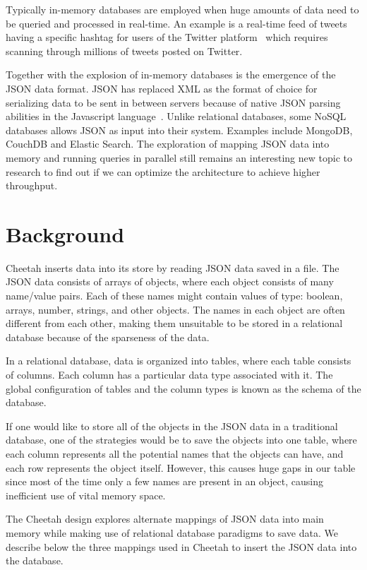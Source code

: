 \documentclass[11pt,journal,compsoc]{IEEEtran}
\begin{document}
Typically in-memory databases are employed when huge amounts of data need to be
queried and processed in real-time. An example is a real-time feed of tweets
having a specific hashtag for users of the Twitter platform~\cite{twitter}
which requires scanning through millions of tweets posted on Twitter.


Together with the explosion of in-memory databases is the emergence of the JSON
data format. JSON has replaced XML as the format of choice for serializing data
to be sent in between servers because of native JSON parsing abilities in the
Javascript language~\cite{json}. Unlike relational
databases, some NoSQL databases allows JSON as input into their system. Examples
include MongoDB, CouchDB and Elastic Search. The exploration of mapping JSON
data into memory and running queries in parallel still remains an interesting
new topic to research to find out if we can optimize the architecture to achieve
higher throughput.

\section{Background}

Cheetah inserts data into its store by reading JSON data saved in a file. The
JSON data consists of arrays of objects, where each object consists of many
name/value pairs. Each of these names might contain values of type: boolean,
arrays, number, strings, and other objects. The names in each object are often
different from each other, making them unsuitable to be stored in a relational
database because of the sparseness of the data.


In a relational database, data is organized into tables, where each table
consists of columns. Each column has a particular data type associated with it.
The global configuration of tables and the column types is known as the schema
of the database.


If one would like to store all of the objects in the JSON data in a traditional
database, one of the strategies would be to save the objects into one table,
where each column represents all the potential names that the objects can have,
and each row represents the object itself. However, this causes huge gaps in our
table since most of the time only a few names are present in an object, causing
inefficient use of vital memory space.


The Cheetah design explores alternate mappings of JSON data into main memory
while making use of relational database paradigms to save data. We describe
below the three mappings used in Cheetah to insert the JSON data into the
database.
\end{document}
